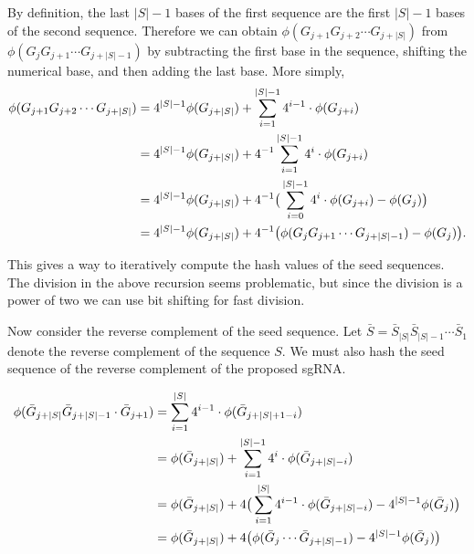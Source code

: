 \documentclass{article}[12pt]
\begin{document}
By definition, the last $|S| - 1$ bases of the first sequence
are the first $|S| - 1$ bases of the second sequence.
Therefore we can obtain $\phi(G_{j + 1} G_{j+2} \cdots G_{j + |S|} )$
from $\phi(G_{j} G_{j+1} \cdots G_{j + |S| - 1}) $ by subtracting the 
first base in the sequence, shifting the numerical base, and
then adding the last base.  
More simply,
\begin{align}
\phi(G_{j + 1} G_{j+2} \cdots G_{j + |S|} ) &= 
4^{|S| - 1} \phi( G_{ j + |S|} ) + \sum_{i = 1}^{|S| - 1} 4^{i - 1} \cdot \phi( G_{j + i} )
\notag \\
&= 4^{|S| - 1} \phi( G_{ j + |S|} ) + 4^{-1} \sum_{i = 1}^{|S| - 1} 4^{i} \cdot \phi (G_{j + i}) 
\notag \\
&= 4^{|S| - 1} \phi( G_{ j + |S|} ) + 4^{-1} \big( \sum_{i = 0}^{|S| - 1} 4^{i} \cdot \phi(G_{j + i} )
- \phi(G_{j}) \big)
\notag \\
&= 4^{|S| - 1} \phi( G_{ j + |S|} ) + 4^{-1} \big( \phi(G_{j} G_{j+1} \cdots G_{j + |S| - 1}) - \phi(G_{j}) \big).
\notag
\end{align}

This gives a way to iteratively compute the hash values of
the seed sequences.  The division in the above
recursion seems problematic, but since the division
is a power of two we can use bit shifting for fast division.

Now consider the reverse complement of the seed sequence.  
Let $\bar{S} = \bar{S}_{|S|} \bar{S}_{|S| - 1} \cdots \bar{S}_{1}$
denote the reverse complement of the sequence $S$.  
We must also hash the seed sequence of the reverse complement 
of the proposed sgRNA.  

\begin{align}
\phi( \bar{G}_{j + |S|} \bar{G}_{j + |S| - 1} \cdot \bar{G}_{j + 1})
&= \sum_{i = 1}^{|S|} 4^{i - 1} \cdot \phi(\bar{G}_{j + |S| + 1 - i})
\notag \\
&= \phi ( \bar{G}_{j + |S|}) + \sum_{i = 1}^{|S| - 1} 4^{i} \cdot \phi(\bar{G}_{j + |S| - i})
\notag \\
&= \phi ( \bar{G}_{j + |S|})  + 4 \big( \sum_{i = 1}^{|S|} 4^{i - 1} \cdot \phi( \bar{G}_{j + |S| - i})
- 4^{|S| - 1} \phi( \bar{G}_{j}) \big)
\notag \\
&= \phi ( \bar{G}_{j + |S|})  + 4 \big( \phi(\bar{G}_{j} \cdots \bar{G}_{j + |S| - 1}) - 4^{|S| - 1}
\phi(\bar{G}_{j}) \big)
\notag
\end{align}
\end{document}
